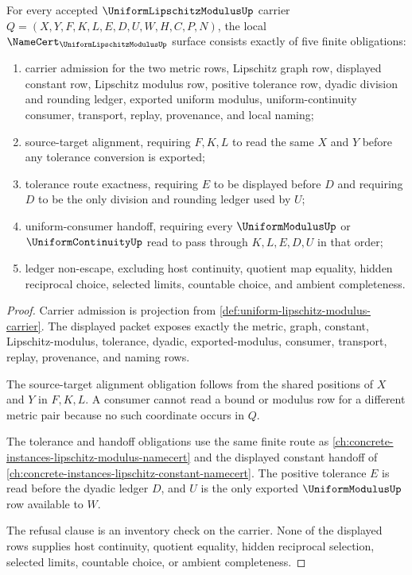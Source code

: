 \begin{theorem}\label{thm:uniform-lipschitz-modulus-namecert-obligations}
For every accepted $\UniformLipschitzModulusUp$ carrier $Q=(X,Y,F,K,L,E,D,U,W,H,C,P,N)$, the local $\NameCert_{\UniformLipschitzModulusUp}$ surface consists exactly of five finite obligations:
\begin{enumerate}
\item carrier admission for the two metric rows, Lipschitz graph row, displayed constant row, Lipschitz modulus row, positive tolerance row, dyadic division and rounding ledger, exported uniform modulus, uniform-continuity consumer, transport, replay, provenance, and local naming;
\item source-target alignment, requiring $F,K,L$ to read the same $X$ and $Y$ before any tolerance conversion is exported;
\item tolerance route exactness, requiring $E$ to be displayed before $D$ and requiring $D$ to be the only division and rounding ledger used by $U$;
\item uniform-consumer handoff, requiring every $\UniformModulusUp$ or $\UniformContinuityUp$ read to pass through $K,L,E,D,U$ in that order;
\item ledger non-escape, excluding host continuity, quotient map equality, hidden reciprocal choice, selected limits, countable choice, and ambient completeness.
\end{enumerate}
\end{theorem}
\begin{proof}
Carrier admission is projection from \autoref{def:uniform-lipschitz-modulus-carrier}. The displayed packet exposes exactly the metric, graph, constant, Lipschitz-modulus, tolerance, dyadic, exported-modulus, consumer, transport, replay, provenance, and naming rows.

The source-target alignment obligation follows from the shared positions of $X$ and $Y$ in $F,K,L$. A consumer cannot read a bound or modulus row for a different metric pair because no such coordinate occurs in $Q$.

The tolerance and handoff obligations use the same finite route as \autoref{ch:concrete-instances-lipschitz-modulus-namecert} and the displayed constant handoff of \autoref{ch:concrete-instances-lipschitz-constant-namecert}. The positive tolerance $E$ is read before the dyadic ledger $D$, and $U$ is the only exported $\UniformModulusUp$ row available to $W$.

The refusal clause is an inventory check on the carrier. None of the displayed rows supplies host continuity, quotient equality, hidden reciprocal selection, selected limits, countable choice, or ambient completeness.
\end{proof}

